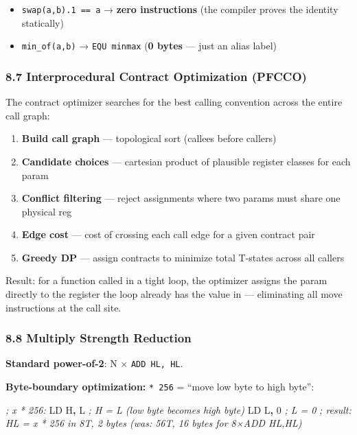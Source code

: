 \documentclass[
  11pt,
  a4paper,
]{report}
\newenvironment{Shaded}{\begin{snugshade}\small}{\end{snugshade}}
\newcommand{\CommentTok}[1]{\textcolor[rgb]{0.56,0.35,0.01}{\textit{#1}}}
\newcommand{\DecValTok}[1]{\textcolor[rgb]{0.00,0.00,0.81}{#1}}
\newcommand{\NormalTok}[1]{#1}
\newcommand{\OperatorTok}[1]{\textcolor[rgb]{0.81,0.36,0.00}{\textbf{#1}}}
\providecommand{\tightlist}{%
  \setlength{\itemsep}{0pt}\setlength{\parskip}{0pt}}
\begin{document}
\begin{itemize}
\tightlist
\item
  \texttt{swap(a,b).1\ ==\ a} → \textbf{zero instructions} (the compiler
  proves the identity statically)
\item
  \texttt{min\_of(a,b)} → \texttt{EQU\ minmax} (\textbf{0 bytes} ---
  just an alias label)
\end{itemize}

\subsubsection{8.7 Interprocedural Contract Optimization
(PFCCO)}\label{interprocedural-contract-optimization-pfcco}

The contract optimizer searches for the best calling convention across
the entire call graph:

\begin{enumerate}
\def\labelenumi{\arabic{enumi}.}
\tightlist
\item
  \textbf{Build call graph} --- topological sort (callees before
  callers)
\item
  \textbf{Candidate choices} --- cartesian product of plausible register
  classes for each param
\item
  \textbf{Conflict filtering} --- reject assignments where two params
  must share one physical reg
\item
  \textbf{Edge cost} --- cost of crossing each call edge for a given
  contract pair
\item
  \textbf{Greedy DP} --- assign contracts to minimize total T-states
  across all callers
\end{enumerate}

Result: for a function called in a tight loop, the optimizer assigns the
param directly to the register the loop already has the value in ---
eliminating all move instructions at the call site.

\subsubsection{8.8 Multiply Strength
Reduction}\label{multiply-strength-reduction}

\textbf{Standard power-of-2}: N × \texttt{ADD\ HL,\ HL}.

\textbf{Byte-boundary optimization:} \texttt{*\ 256} = ``move low byte
to high byte'':

\begin{Shaded}
\begin{Highlighting}[]
\CommentTok{; x * 256:}
\NormalTok{LD H}\OperatorTok{,}\NormalTok{ L     }\CommentTok{; H = L (low byte becomes high byte)}
\NormalTok{LD L}\OperatorTok{,} \DecValTok{0}     \CommentTok{; L = 0}
\CommentTok{; result: HL = x * 256 in 8T, 2 bytes (was: 56T, 16 bytes for 8×ADD HL,HL)}
\end{Highlighting}
\end{Shaded}
\end{document}
